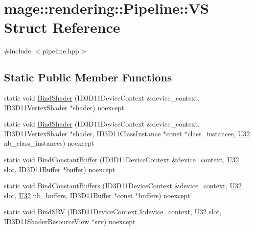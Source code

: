 \hypertarget{structmage_1_1rendering_1_1_pipeline_1_1_v_s}{}\section{mage\+:\+:rendering\+:\+:Pipeline\+:\+:VS Struct Reference}
\label{structmage_1_1rendering_1_1_pipeline_1_1_v_s}


{\ttfamily \#include $<$pipeline.\+hpp$>$}

\subsection*{Static Public Member Functions}
\begin{DoxyCompactItemize}
\item 
static void \mbox{\hyperlink{structmage_1_1rendering_1_1_pipeline_1_1_v_s_ad68f2b5d16bf98cf4ac8658d05a672c9}{Bind\+Shader}} (I\+D3\+D11\+Device\+Context \&device\+\_\+context, I\+D3\+D11\+Vertex\+Shader $\ast$shader) noexcept
\item 
static void \mbox{\hyperlink{structmage_1_1rendering_1_1_pipeline_1_1_v_s_a2f30f346f5a94f3870a42fd5e7e240af}{Bind\+Shader}} (I\+D3\+D11\+Device\+Context \&device\+\_\+context, I\+D3\+D11\+Vertex\+Shader $\ast$shader, I\+D3\+D11\+Class\+Instance $\ast$const $\ast$class\+\_\+instances, \mbox{\hyperlink{namespacemage_aa5d6eaabaac3cdd01873d6a3d27e90f3}{U32}} nb\+\_\+class\+\_\+instances) noexcept
\item 
static void \mbox{\hyperlink{structmage_1_1rendering_1_1_pipeline_1_1_v_s_a260784ea194b9e88cf6ec2de0ec5badd}{Bind\+Constant\+Buffer}} (I\+D3\+D11\+Device\+Context \&device\+\_\+context, \mbox{\hyperlink{namespacemage_aa5d6eaabaac3cdd01873d6a3d27e90f3}{U32}} slot, I\+D3\+D11\+Buffer $\ast$buffer) noexcept
\item 
static void \mbox{\hyperlink{structmage_1_1rendering_1_1_pipeline_1_1_v_s_ae00a2fbec7f892b1997b9866ea19aba9}{Bind\+Constant\+Buffers}} (I\+D3\+D11\+Device\+Context \&device\+\_\+context, \mbox{\hyperlink{namespacemage_aa5d6eaabaac3cdd01873d6a3d27e90f3}{U32}} slot, \mbox{\hyperlink{namespacemage_aa5d6eaabaac3cdd01873d6a3d27e90f3}{U32}} nb\+\_\+buffers, I\+D3\+D11\+Buffer $\ast$const $\ast$buffers) noexcept
\item 
static void \mbox{\hyperlink{structmage_1_1rendering_1_1_pipeline_1_1_v_s_a0f659133040954a1f2a2aa481c583ab6}{Bind\+S\+RV}} (I\+D3\+D11\+Device\+Context \&device\+\_\+context, \mbox{\hyperlink{namespacemage_aa5d6eaabaac3cdd01873d6a3d27e90f3}{U32}} slot, I\+D3\+D11\+Shader\+Resource\+View $\ast$srv) noexcept

\end{DoxyCompactItemize}
